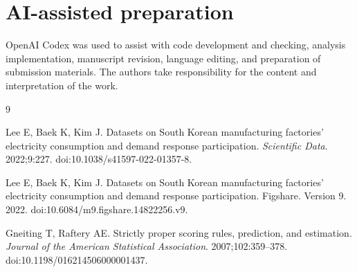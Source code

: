 \documentclass[AMA,Times1COL]{WileyNJDv5}
\begin{document}

\FloatBarrier


\FloatBarrier


\FloatBarrier


\FloatBarrier


\FloatBarrier


\FloatBarrier

\FloatBarrier

\section*{AI-assisted preparation}
OpenAI Codex was used to assist with code development and checking, analysis implementation, manuscript revision, language editing, and preparation of submission materials. The authors take responsibility for the content and interpretation of the work.

\begin{thebibliography}{9}

Lee E, Baek K, Kim J.
Datasets on South Korean manufacturing factories' electricity
consumption and demand response participation.
\textit{Scientific Data}. 2022;9:227.
doi:10.1038/s41597-022-01357-8.

Lee E, Baek K, Kim J.
Datasets on South Korean manufacturing factories' electricity
consumption and demand response participation.
Figshare. Version 9. 2022.
doi:10.6084/m9.figshare.14822256.v9.

Gneiting T, Raftery AE.
Strictly proper scoring rules, prediction, and estimation.
\textit{Journal of the American Statistical Association}.
2007;102:359--378.
doi:10.1198/016214506000001437.

\end{thebibliography}
\end{document}
